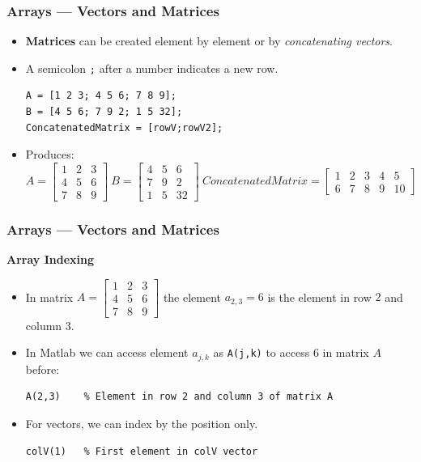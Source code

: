 \documentclass[11pt,xcolor={svgnames},aspectratio=169,usepdftitle=false]{beamer}
\begin{document}
\begin{frame}[fragile]
    \frametitle{Arrays --- Vectors and Matrices}
\begin{itemize}
    \item \alert{\textbf{Matrices}} can be created element by element or by \textit{concatenating vectors}.
    \item A semicolon \verb+;+ after a number indicates a new row.
\begin{lstlisting}
A = [1 2 3; 4 5 6; 7 8 9];
B = [4 5 6; 7 9 2; 1 5 32];
ConcatenatedMatrix = [rowV;rowV2];
\end{lstlisting}
    \item Produces:
    \[
    A = \begin{bmatrix}
    1 & 2 & 3 \\
    4 & 5 & 6 \\
    7 & 8 & 9 
    \end{bmatrix} \ 
    B = \begin{bmatrix}
    4 & 5 & 6 \\
    7 & 9 & 2 \\
    1 & 5 & 32
    \end{bmatrix} \ 
    ConcatenatedMatrix = \begin{bmatrix}
    1 & 2 & 3 & 4 & 5 \\
    6 & 7 & 8 & 9 & 10
    \end{bmatrix}
    \]
\end{itemize}
\end{frame}

\begin{frame}[fragile]
    \frametitle{Arrays --- Vectors and Matrices}
\alert{\textbf{Array Indexing}}
    \begin{itemize}
        \item In matrix $A = \begin{bmatrix}
            1 & 2 & 3 \\
            4 & 5 & 6 \\
            7 & 8 & 9 
            \end{bmatrix}$ the element $a_{2,3} = 6$ is the element in row $2$ and column $3$.
        \item In Matlab we can access element $a_{j,k}$ as \verb;A(j,k); to access $6$ in matrix $A$ before:
\begin{lstlisting}
A(2,3)    % Element in row 2 and column 3 of matrix A
\end{lstlisting}
        \item For vectors, we can index by the position only.
\begin{lstlisting}
colV(1)   % First element in colV vector
\end{lstlisting}
    \end{itemize}
\end{frame}
\end{document}
